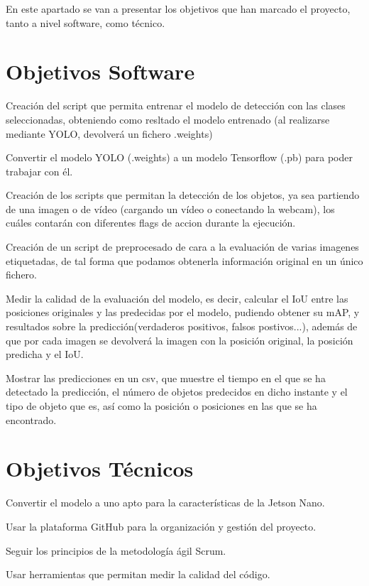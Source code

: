 
En este apartado se van a presentar los objetivos que han marcado el proyecto, tanto a nivel software, como técnico.

\section{Objetivos Software}
\begin{list}{\textbullet}{ %
    \addtolength{\itemsep}{-2mm} %
    \setlength{\itemindent}{2mm}}

    \item Creación del script que permita entrenar el modelo de detección con las clases seleccionadas, obteniendo como resltado el modelo entrenado (al realizarse mediante YOLO, devolverá un fichero .weights)
    \item Convertir el modelo YOLO (.weights) a un modelo Tensorflow (.pb) para poder trabajar con él.
    \item Creación de los scripts que permitan la detección de los objetos, ya sea partiendo de una imagen o de vídeo (cargando un vídeo o conectando la webcam), los cuáles contarán con diferentes flags de accion durante la ejecución.
    \item Creación de un script de preprocesado de cara a la evaluación de varias imagenes etiquetadas, de tal forma que podamos obtenerla información original en un único fichero.
    \item Medir la calidad de la evaluación del modelo, es decir, calcular el IoU entre las posiciones originales y las predecidas por el modelo, pudiendo obtener su mAP, y resultados sobre la predicción(verdaderos positivos, falsos postivos...), además de que por cada imagen se devolverá la imagen con la posición original, la posición predicha y el IoU.
    \item Mostrar las predicciones en un csv, que muestre el tiempo en el que se ha detectado la predicción, el número de objetos predecidos en dicho instante y el tipo de objeto que es, así como la posición o posiciones en las que se ha encontrado.
\end{list}

\section{Objetivos Técnicos}
\begin{list}{\textbullet}{ %
    \addtolength{\itemsep}{-2mm} %
    \setlength{\itemindent}{2mm}}

    \item Convertir el modelo a uno apto para la características de la Jetson Nano.
    \item Usar la plataforma GitHub para la organización y gestión del proyecto.
    \item Seguir los principios de la metodología ágil Scrum.
    \item Usar herramientas que permitan medir la calidad del código.
\end{list}

